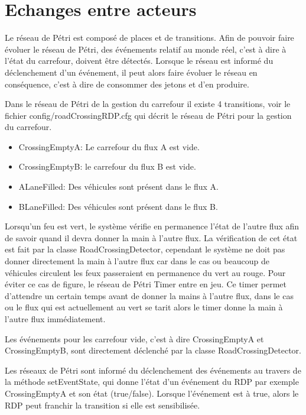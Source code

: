 \chapter{Echanges entre acteurs}

Le réseau de Pétri est composé de places et de transitions. Afin de pouvoir faire évoluer le réseau de Pétri, des événements relatif au monde réel, c'est à dire à l'état du carrefour, doivent être détectés. Lorsque le réseau est informé du déclenchement d'un événement, il peut alors faire évoluer le réseau en conséquence, c'est à dire de consommer des jetons et d'en produire.

Dans le réseau de Pétri de la gestion du carrefour il existe 4 transitions, voir le fichier config/roadCrossingRDP.cfg qui décrit le réseau de Pétri pour la gestion du carrefour.

\begin{itemize}
\item CrossingEmptyA: Le carrefour du flux A est vide.
\item CrossingEmptyB: le carrefour du flux B est vide.
\item ALaneFilled: Des véhicules sont présent dans le flux A.
\item BLaneFilled: Des véhicules sont présent dans le flux B.
\end{itemize}

Lorsqu'un feu est vert, le système vérifie en permanence l'état de l'autre flux afin de savoir quand il devra donner la main à l'autre flux. La vérification de cet état est fait par la classe RoadCrossingDetector, cependant le système ne doit pas donner directement la main à l'autre flux car dans le cas ou beaucoup de véhicules circulent les feux passeraient en permanence du vert au rouge. Pour éviter ce cas de figure, le réseau de Pétri Timer entre en jeu. Ce timer permet d'attendre un certain temps avant de donner la mains à l'autre flux, dans le cas ou le flux qui est actuellement au vert se tarit alors le timer donne la main à l'autre flux immédiatement.

Les événements pour les carrefour vide, c'est à dire CrossingEmptyA et CrossingEmptyB, sont directement déclenché par la classe RoadCrossingDetector.

Les réseaux de Pétri sont informé du déclenchement des événements au travers de la méthode setEventState, qui donne l'état d'un événement du RDP par exemple CrossingEmptyA et son état (true/false). Lorsque l'événement est à true, alors le RDP peut franchir la transition si elle est sensibilisée.


